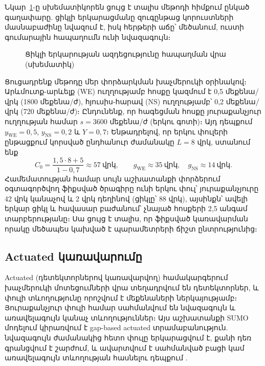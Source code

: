 \documentclass[12pt,a4paper]{extreport}
\begin{document}
Նկար~\ref{fig:cycle}-ը սխեմատիկորեն ցույց է տալիս մեթոդի հիմքում ընկած գաղափարը. ցիկլի երկարացմանը զուգընթաց կորուստների մասնաբաժինը նվազում է, իսկ հերթերի աճը՝ մեծանում, ուստի գումարային հապաղումն ունի նվազագույն։

\begin{figure}[ht]
\centering
{}
\caption{Ցիկլի երկարության ազդեցությունը հապաղման վրա (սխեմատիկ)}
\label{fig:cycle}
\end{figure}

Ցուցադրենք մեթոդը մեր փորձարկման խաչմերուկի օրինակով։ Արևմուտք-արևելք (WE) ուղղությամբ հոսքը կազմում է 0,5 մեքենա/վրկ (1800 մեքենա/ժ), հյուսիս-հարավ (NS) ուղղությամբ՝ 0,2 մեքենա/վրկ (720 մեքենա/ժ)։ Ընդունենք, որ հագեցման հոսքը յուրաքանչյուր ուղղության համար $s = 3600$ մեքենա/ժ (երկու գոտի)։ Այդ դեպքում $y_{\mathrm{WE}} = 0{,}5$, $y_{\mathrm{NS}} = 0{,}2$ և $Y = 0{,}7$։ Ենթադրելով, որ երկու փուլերի ընթացքում կորսված ընդհանուր ժամանակը $L = 8$ վրկ, ստանում ենք
\begin{equation}
  C_0 = \frac{1{,}5\cdot 8 + 5}{1 - 0{,}7} \approx 57\ \text{վրկ},
  \qquad
  g_{\mathrm{WE}} \approx 35\ \text{վրկ}, \quad g_{\mathrm{NS}} \approx 14\ \text{վրկ}.
\end{equation}
Համեմատության համար սույն աշխատանքի փորձերում օգտագործվող ֆիքսված ծրագիրը ունի երկու փուլ՝ յուրաքանչյուրը 42 վրկ կանաչով և 2 վրկ դեղինով (ցիկլը՝ 88 վրկ), այսինքն՝ ավելի երկար ցիկլ և հավասար բաժանում՝ չնայած հոսքերի 2,5 անգամ տարբերությանը։ Սա ցույց է տալիս, որ ֆիքսված կառավարման որակը մեծապես կախված է պարամետրերի ճիշտ ընտրությունից։

\subsection{Actuated կառավարումը}

Actuated (դետեկտորներով կառավարվող) համակարգերում խաչմերուկի մոտեցումների վրա տեղադրվում են դետեկտորներ, և փուլի տևողությունը որոշվում է մեքենաների ներկայությամբ։ Յուրաքանչյուր փուլի համար սահմանվում են նվազագույն և առավելագույն կանաչ տևողություններ։ Այս աշխատանքի SUMO մոդելում կիրառվում է gap-based actuated տրամաբանություն. նվազագույն ժամանակից հետո փուլը երկարացվում է, քանի դեռ գրանցվում է շարժում, և ավարտվում է սահմանված բացի կամ առավելագույն տևողության հասնելու դեպքում \cite{sumoTrafficLights}.
\end{document}

